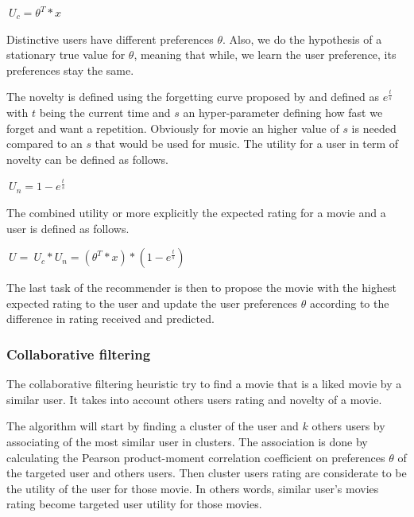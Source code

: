 \documentclass[letterpaper]{article}
\begin{document}
\begin{center}
	$ \ U_{c} = \theta^{T} * x$ 
\end{center}

Distinctive users have different preferences $\theta$. Also, we do the hypothesis of a stationary true value for $\theta$, meaning that while, we learn the user preference, its preferences stay the same.

The novelty is defined using the forgetting curve proposed by \cite{ebbinghaus1913memory} and defined as $ e^{\frac{t}{s}} $ with $t$ being the current time and $s$ an hyper-parameter defining how fast we forget and want a repetition. Obviously for movie an higher value of $s$ is needed compared to an $s$ that would be used for music. The utility for a user in term of novelty can be defined as follows.

\begin{center}
	$ \ U_{n} = 1 - e^{\frac{t}{s}} $ 
\end{center}

The combined utility or more explicitly the expected rating for a movie and a user is defined as follows.

\begin{center}
	$ \ U = \ U_{c} *  U_{n} = (\theta^{T} * x) * (1 - e^{\frac{t}{s}}) $ 
\end{center}

The last task of the recommender is then to propose the movie with the highest expected rating to the user and update the user preferences $\theta$ according to the difference in rating received and predicted.

\subsubsection{Collaborative filtering}

The collaborative filtering heuristic try to find a movie that is a liked movie by a similar user. It takes into account others users rating and novelty of a movie.

The algorithm will start by finding a cluster of the user and $k$ others users by associating of the most similar user in clusters. The association is done by calculating the Pearson product-moment correlation coefficient on preferences $\theta$ of the targeted user and others users. Then cluster users rating are considerate to be the utility of the user for those movie. In others words, similar user's movies rating become targeted user utility for those movies.
\end{document}
